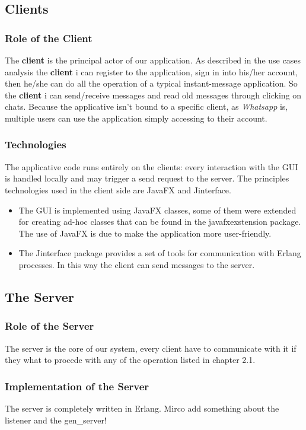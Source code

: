 \subsection{Clients}
\subsubsection{Role of the Client}
The \textbf{client} is the principal actor of our application.
As described in the use cases analysis the  \textbf{client} i can register to the application, sign in into his/her account, then he/she can do all the operation of a typical instant-message application. So the  \textbf{client} i can send/receive messages and read old messages through clicking on chats. 
Because the applicative isn’t bound to a specific client, as \textit{Whatsapp} is, multiple users can use the application simply accessing to their account.

\subsubsection{Technologies}
The applicative code runs entirely on the clients: every interaction with the GUI is handled locally and may trigger a send request to the server. The principles technologies used in the client side are JavaFX and Jinterface.
\begin{itemize}
	\item The GUI is implemented using JavaFX classes, some of them were extended for creating ad-hoc classes that can be found in the javafxexstension package. The use of JavaFX is due to make the application more user-friendly.
	\item The Jinterface package provides a set of tools for communication with Erlang processes. In this way the client can send messages to the server.
\end{itemize}

\subsection{The Server}
\subsubsection{Role of the Server}
The server is the core of our system, every client have to communicate with it if they what to procede with any of the operation listed in chapter 2.1.

\subsubsection{Implementation of the Server}
The server is completely written in Erlang. 
Mirco add something about the listener and the gen\_server!


